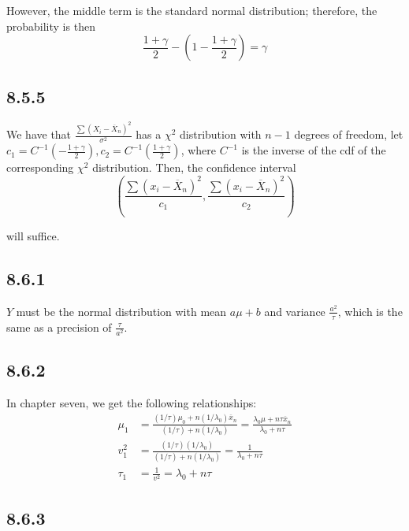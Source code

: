 \documentclass[12pt,letterpaper]{article}
\theoremstyle{definition}
\newcommand{\var}[1]{\text{Var}\left(#1\right)}
\begin{document}
However, the middle term is the standard normal distribution; therefore, the
probability is then
\[
  \frac{1 + \gamma}{2} - (1 - \frac{1 + \gamma}{2}) = \gamma
\]

\subsection*{8.5.5}

We have that $\frac{\sum(X_i - \overline{X}_n)^2}{\sigma^2}$ has a $\chi^2$
distribution with $n - 1$ degrees of freedom, let $c_1 =
C^{-1}(-\frac{1+\gamma}{2}), c_2 = C^{-1}(\frac{1+\gamma}{2})$, where $C^{-1}$
is the inverse of the cdf of the corresponding $\chi^2$ distribution. Then,
the confidence interval
\[
  (\frac{\sum(x_i - \overline{X}_n)^2}{c_1}, \frac{\sum(x_i - \overline{X}_n)^2}{c_2})
\]

will suffice.

\subsection*{8.6.1}


$Y$ must be the normal distribution with mean $a\mu + b$ and variance
$\frac{a^2}{\tau}$, which is the same as a precision of $\frac{\tau}{a^2}$.

\subsection*{8.6.2}

In chapter seven, we get the following relationships:
\begin{align*}
  \mu_1 &= \frac{(1/\tau)\mu_0 + n(1/\lambda_0)\overline{x}_n}{(1/\tau) + n(1/\lambda_0)} = \frac{\lambda_0\mu + n\tau\overline{x}_n}{\lambda_0 + n\tau}\\
  v_1^2 &= \frac{(1/\tau)(1/\lambda_0)}{(1/\tau) + n(1/\lambda_0)} = \frac{1}{\lambda_0 + n\tau} \\
  \tau_1 &= \frac{1}{v^2} = \lambda_0 + n\tau 
\end{align*}

\subsection*{8.6.3}
\end{document}
